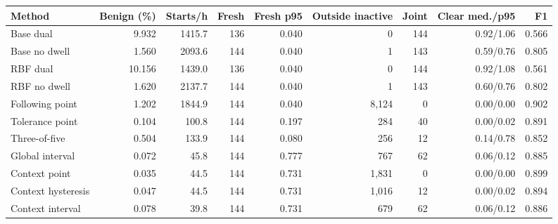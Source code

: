 \begin{tabular}{lrrrrrrrr}\toprule
Method & Benign (\%) & Starts/h & Fresh & Fresh p95 & Outside inactive & Joint & Clear med./p95 & F1\\\midrule
Base dual & 9.932 & 1415.7 & 136 & 0.040 & 0 & 144 & 0.92/1.06 & 0.566 \\
Base no dwell & 1.560 & 2093.6 & 144 & 0.040 & 1 & 143 & 0.59/0.76 & 0.805 \\
RBF dual & 10.156 & 1439.0 & 136 & 0.040 & 0 & 144 & 0.92/1.08 & 0.561 \\
RBF no dwell & 1.620 & 2137.7 & 144 & 0.040 & 1 & 143 & 0.60/0.76 & 0.802 \\
Following point & 1.202 & 1844.9 & 144 & 0.040 & 8,124 & 0 & 0.00/0.00 & 0.902 \\
Tolerance point & 0.104 & 100.8 & 144 & 0.197 & 284 & 40 & 0.00/0.02 & 0.891 \\
Three-of-five & 0.504 & 133.9 & 144 & 0.080 & 256 & 12 & 0.14/0.78 & 0.852 \\
Global interval & 0.072 & 45.8 & 144 & 0.777 & 767 & 62 & 0.06/0.12 & 0.885 \\
Context point & 0.035 & 44.5 & 144 & 0.731 & 1,831 & 0 & 0.00/0.00 & 0.899 \\
Context hysteresis & 0.047 & 44.5 & 144 & 0.731 & 1,016 & 12 & 0.00/0.02 & 0.894 \\
Context interval & 0.078 & 39.8 & 144 & 0.731 & 679 & 62 & 0.06/0.12 & 0.886 \\
\bottomrule\end{tabular}

